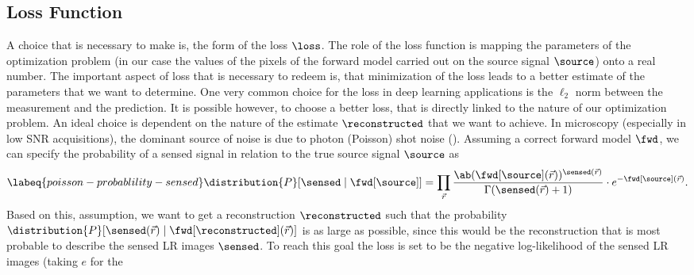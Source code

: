 \subsection{Loss Function}

A choice that is necessary to make is, the form of the loss \(\loss\).
The role of the loss function is mapping the parameters of the optimization problem (in our case the values of the
    pixels of the forward model carried out on the source signal \(\source\)) onto a real number.
The important aspect of loss that is necessary to redeem is, that minimization of the loss leads to a better estimate of
    the parameters that we want to determine.
One very common choice for the loss in deep learning applications is the \(\ell_2\) norm between the measurement and the
    prediction.
It is possible however, to choose a better loss, that is directly linked to the nature of our optimization problem.
An ideal choice is dependent on the nature of the estimate \(\reconstructed\) that we want to achieve.
In microscopy (especially in low \ac{SNR} acquisitions), the dominant source of noise is due to photon (Poisson) shot noise
    ().
Assuming a correct forward model \(\fwd\), we can specify the probability of a sensed signal in relation to the true 
    source signal \(\source\) as
    \begin{equation*}
        \labeq{poisson-probablility-sensed}
        \distribution{P}[\sensed \mid \fwd[\source]] = \prod_{\vec{r}}
        \frac{\ab(\fwd[\source](\vec{r}))^{\sensed(\vec{r})}}{\Gamma(\sensed(\vec{r}) + 1)} \cdot e^{-\fwd[\source](\vec{r})}.
    \end{equation*}
Based on this, assumption, we want to get a reconstruction \(\reconstructed\) such that the probability
    \(\distribution{P}[\sensed(\vec{r}) \mid \fwd[\reconstructed](\vec{r})]\) is as large as possible, since this would
    be the reconstruction that is most probable to describe the sensed \ac{LR} images \(\sensed\).
To reach this goal the loss is set to be the negative log-likelihood of the sensed \ac{LR} images (taking \(e\) for the 
